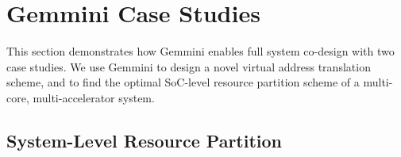 \section{Gemmini Case Studies}\label{sec:casestudies}
This section demonstrates how Gemmini enables full system co-design with two case studies. We use Gemmini to design a novel virtual address translation scheme, and to find the optimal SoC-level resource partition scheme of a multi-core, multi-accelerator system.



\subsection{System-Level Resource Partition}
\label{cache-contention}





